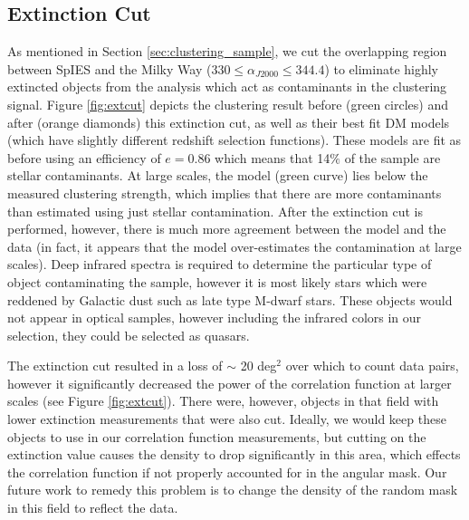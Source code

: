 \documentclass[apj, numberedappendix]{emulateapj}
\begin{document}
\subsection{Extinction Cut}
As mentioned in Section \ref{sec:clustering_sample}, we cut the overlapping region between SpIES and the Milky Way ($330 \leq \alpha_{J2000} \leq 344.4$) to eliminate highly extincted objects from the analysis which act as contaminants in the clustering signal. Figure \ref{fig:extcut} depicts the clustering result before (green circles) and after (orange diamonds) this extinction cut, as well as their best fit DM models (which have slightly different redshift selection functions). These models are fit as before using an efficiency of $e = 0.86$ which means that 14$\%$ of the sample are stellar contaminants. At large scales, the model (green curve) lies below the measured clustering strength, which implies that there are more contaminants than estimated using just stellar contamination. After the extinction cut is performed, however, there is much more agreement between the model and the data (in fact, it appears that the model over-estimates the contamination at large scales). Deep infrared spectra is required to determine the particular type of object contaminating the sample, however it is most likely stars which were reddened by Galactic dust such as late type M-dwarf stars. These objects would not appear in optical samples, however including the infrared colors in our selection, they could be selected as quasars. 

The extinction cut resulted in a loss of $\sim$ 20 deg$^{2}$ over which to count data pairs, however it significantly decreased the power of the correlation function at larger scales (see Figure \ref{fig:extcut}). There were, however, objects in that field with lower extinction measurements that were also cut. Ideally, we would keep these objects to use in our correlation function measurements, but cutting on the extinction value causes the density to drop significantly in this area, which effects the correlation function if not properly accounted for in the angular mask. Our future work to remedy this problem is to change the density of the random mask in this field to reflect the data.
\end{document}
